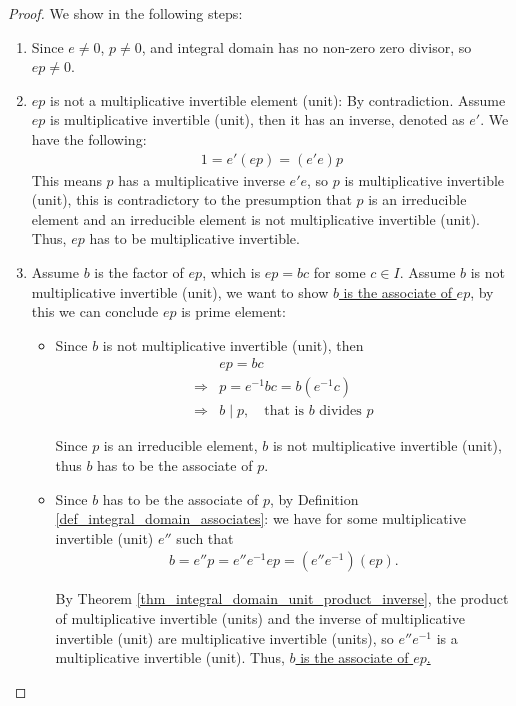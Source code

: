 \documentclass[utf8]{ctexbook}
\theoremstyle{definition}
\begin{document}
\begin{proof}
We show in the following steps:
\begin{enumerate}
\item{Since $e \neq 0$, $p \neq 0$, and integral domain has no non-zero zero divisor, so $e p \neq 0$.}
\item{$e p $ is not a multiplicative invertible element (unit): By contradiction. Assume $e p$ is multiplicative invertible (unit), then it has an inverse, denoted as $e'$. We have the following:
\begin{align*}
1 = e' (e p) = (e' e ) p
\end{align*}
This means $p$ has a multiplicative inverse $e' e$, so $p$ is multiplicative invertible (unit), this is contradictory to the presumption that $p$ is an irreducible element and an irreducible element is not multiplicative invertible (unit). Thus, $ep$ has to be multiplicative invertible.}
\item{Assume $b$ is the factor of $e p$, which is $ep = bc$ for some $c \in I$. Assume $b$ is not multiplicative invertible (unit), we want to show \underline{$b$ is the associate of $e p$}, by this we can conclude $e p$ is prime element:}
\begin{itemize}
\item{Since $b$ is not multiplicative invertible (unit), then
\begin{align*}
& e p = b c  \\
\Longrightarrow & p = e^{-1} b c = b (e^{-1} c ) \\
\Longrightarrow & b \mid p, \quad \mbox{that is } b \mbox{ divides } p
\end{align*}

Since $p$ is an irreducible element, $b$ is not multiplicative invertible (unit), thus $b$ has to be the associate of $p$.} 
\item{Since $b$ has to be the associate of $p$, by Definition \ref{def_integral_domain_associates}: we have for some multiplicative invertible (unit) $e''$ such that
\begin{align*}
b = e'' p = e'' e^{-1} e p = (e'' e^{-1} ) (e p) .
\end{align*}

By Theorem \ref{thm_integral_domain_unit_product_inverse}, the product of multiplicative invertible (units) and the inverse of multiplicative invertible (unit) are multiplicative invertible (units), so $e'' e^{-1} $ is a multiplicative invertible (unit). Thus, \underline{$b$ is the associate of $e p$.}
}
\end{itemize}

\end{enumerate}
\end{proof}
\end{document}
